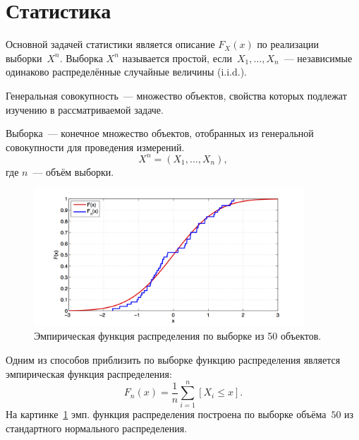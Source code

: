 \section{Статистика}

Основной задачей статистики является описание $F_X(x)$ по реализации выборки~$X^n$. Выборка $X^n$ называется простой, если~$X_1,\dots,X_n$~--- независимые одинаково распределённые случайные величины (i.i.d.).

\begin{definition}
    Генеральная совокупность~--- множество объектов, свойства которых подлежат изучению в рассматриваемой задаче.
\end{definition}

\begin{definition}
    Выборка~--- конечное множество объектов, отобранных из генеральной совокупности для проведения измерений.
    \[
        X^n=\left(X_1,\dots,X_n\right),
    \]
    где $n$~--- объём выборки.
\end{definition}


\begin{figure}[!htb]\center
\includegraphics[width=0.9\textwidth]{lectures/lect1/src/ecdf.png}
\caption{Эмпирическая функция распределения по выборке из 50 объектов.}
\label{fg:lect1:fig-5}
\end{figure}
Одним из способов приблизить по выборке функцию распределения является эмпирическая функция распределения:
\[
    F_n\left(x\right) = \frac1{n} \sum\limits_{i=1}^n \left[X_i\leq x\right].
\]
На картинке~\ref{fg:lect1:fig-5} эмп. функция распределения построена по выборке объёма~$50$ из стандартного нормального распределения.

